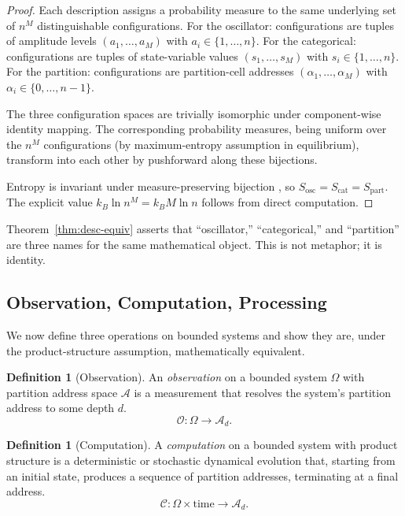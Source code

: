 \documentclass[11pt,a4paper]{article}
\theoremstyle{definition}
\newtheorem{definition}[theorem]{Definition}
\theoremstyle{remark}
\newcommand{\Oc}{\mathcal{O}}
\newcommand{\Cc}{\mathcal{C}}
\newcommand{\Ac}{\mathcal{A}}
\begin{document}
\begin{proof}
Each description assigns a probability measure to the same underlying set of $n^M$ distinguishable configurations. For the oscillator: configurations are tuples of amplitude levels $(a_1, \ldots, a_M)$ with $a_i \in \{1, \ldots, n\}$. For the categorical: configurations are tuples of state-variable values $(s_1, \ldots, s_M)$ with $s_i \in \{1, \ldots, n\}$. For the partition: configurations are partition-cell addresses $(\alpha_1, \ldots, \alpha_M)$ with $\alpha_i \in \{0, \ldots, n-1\}$.

The three configuration spaces are trivially isomorphic under component-wise identity mapping. The corresponding probability measures, being uniform over the $n^M$ configurations (by maximum-entropy assumption in equilibrium), transform into each other by pushforward along these bijections.

Entropy is invariant under measure-preserving bijection \citep{cover2006elements}, so $S_{\text{osc}} = S_{\text{cat}} = S_{\text{part}}$. The explicit value $k_B \ln n^M = k_B M \ln n$ follows from direct computation.
\end{proof}

Theorem~\ref{thm:desc-equiv} asserts that ``oscillator,'' ``categorical,'' and ``partition'' are three names for the same mathematical object. This is not metaphor; it is identity.

\subsection{Observation, Computation, Processing}

We now define three operations on bounded systems and show they are, under the product-structure assumption, mathematically equivalent.

\begin{definition}[Observation]
\label{def:obs}
An \emph{observation} on a bounded system $\Omega$ with partition address space $\Ac$ is a measurement that resolves the system's partition address to some depth $d$.
\[
\Oc: \Omega \to \Ac_d.
\]
\end{definition}

\begin{definition}[Computation]
\label{def:comp}
A \emph{computation} on a bounded system with product structure is a deterministic or stochastic dynamical evolution that, starting from an initial state, produces a sequence of partition addresses, terminating at a final address.
\[
\Cc: \Omega \times \text{time} \to \Ac_d.
\]
\end{definition}
\end{document}
